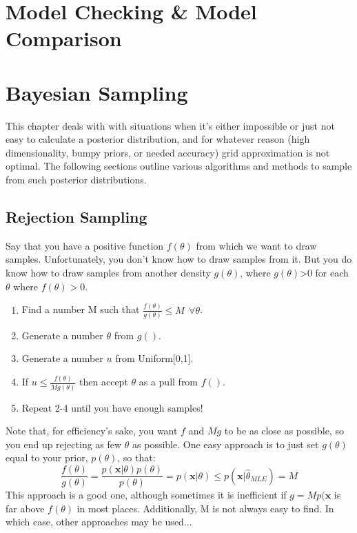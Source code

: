 \documentclass[12pt]{book}
\begin{document}
\chapter{Model Checking \& Model Comparison}


\chapter{Bayesian Sampling}
This chapter deals with with situations when it's either impossible or just not easy to calculate a posterior distribution, and for whatever reason (high dimensionality, bumpy priors, or needed accuracy) grid approximation is not optimal. The following sections outline various algorithms and methods to sample from such posterior distributions.


\section{Rejection Sampling}
Say that you have a positive function $f(\theta)$ from which we want to draw samples. Unfortunately, you don't know how to draw samples from it. But you do know how to draw samples from another density $g(\theta)$, where $g(\theta)$>0 for each $\theta$ where $f(\theta) > 0$.

\begin{enumerate}
\item Find a number M such that $\frac{f(\theta)}{g(\theta)} \leq M \ \ \forall \theta$.
\item Generate a number $\theta$ from $g()$.
\item Generate a number $u$ from Uniform[0,1].
\item If $u \leq \frac{f(\theta)}{Mg(\theta)}$ then accept $\theta$ as a pull from $f()$.
\item Repeat 2-4 until you have enough samples!
\end{enumerate}


Note that, for efficiency's sake, you want $f$ and $Mg$ to be as close as possible, so you end up rejecting as few $\theta$ as possible.
One easy approach is to just set $g(\theta)$ equal to your prior, $p(\theta)$, so that:
\begin{equation}
\frac{f(\theta)}{g(\theta)} = \frac{p(\textbf{x}|\theta)p(\theta)}{p(\theta)} = p(\textbf{x}|\theta) \leq p(\textbf{x}|\hat \theta_{MLE}) = M
\end{equation}
This approach is a good one, although sometimes it is inefficient if $g = Mp(\textbf{x}$ is far above $f(\theta)$ in most places. Additionally, M is not always easy to find. In which case, other approaches may be used...
\end{document}
